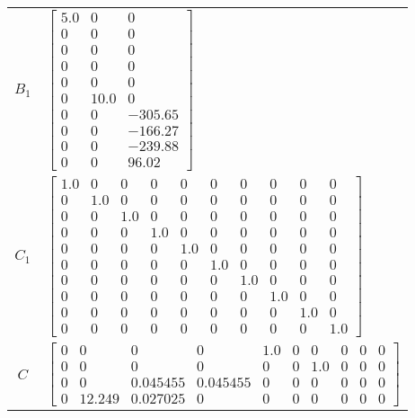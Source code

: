 \begin{tabular}{cl}
 $B_{1}$  & $\left[\begin{matrix}5.0 & 0 & 0\\0 & 0 & 0\\0 & 0 & 0\\0 & 0 & 0\\0 & 0 & 0\\0 & 10.0 & 0\\0 & 0 & -305.65\\0 & 0 & -166.27\\0 & 0 & -239.88\\0 & 0 & 96.02\end{matrix}\right]$                                                                                                                                                                                                                                                                                                                                                                                                                                                                                                    \\
 $C_{1}$  & $\left[\begin{matrix}1.0 & 0 & 0 & 0 & 0 & 0 & 0 & 0 & 0 & 0\\0 & 1.0 & 0 & 0 & 0 & 0 & 0 & 0 & 0 & 0\\0 & 0 & 1.0 & 0 & 0 & 0 & 0 & 0 & 0 & 0\\0 & 0 & 0 & 1.0 & 0 & 0 & 0 & 0 & 0 & 0\\0 & 0 & 0 & 0 & 1.0 & 0 & 0 & 0 & 0 & 0\\0 & 0 & 0 & 0 & 0 & 1.0 & 0 & 0 & 0 & 0\\0 & 0 & 0 & 0 & 0 & 0 & 1.0 & 0 & 0 & 0\\0 & 0 & 0 & 0 & 0 & 0 & 0 & 1.0 & 0 & 0\\0 & 0 & 0 & 0 & 0 & 0 & 0 & 0 & 1.0 & 0\\0 & 0 & 0 & 0 & 0 & 0 & 0 & 0 & 0 & 1.0\end{matrix}\right]$                                                                                                                                                                                                                   \\
   $C$    & $\left[\begin{matrix}0 & 0 & 0 & 0 & 1.0 & 0 & 0 & 0 & 0 & 0\\0 & 0 & 0 & 0 & 0 & 0 & 1.0 & 0 & 0 & 0\\0 & 0 & 0.045455 & 0.045455 & 0 & 0 & 0 & 0 & 0 & 0\\0 & 12.249 & 0.027025 & 0 & 0 & 0 & 0 & 0 & 0 & 0\end{matrix}\right]$                                                                                                                                                                                                                                                                                                                                                                                                                                                   \\

\end{tabular}
